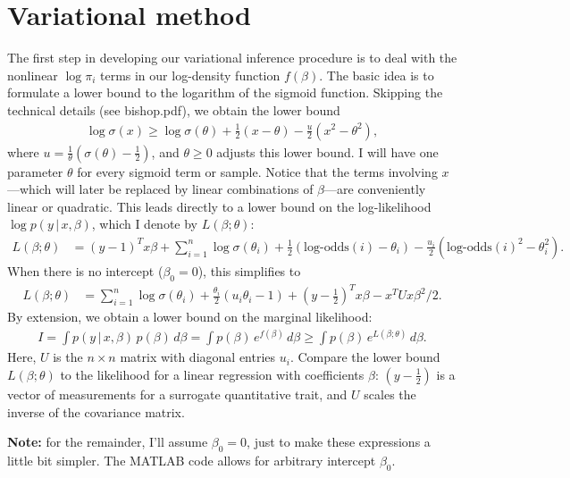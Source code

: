 \documentclass[final]{siamltex}
\newcommand{\smfrac}[2]{{\textstyle\frac{#1}{#2}}}
\newcommand{\half}{{\textstyle\frac{1}{2}}}
\newcommand{\smint}{\textstyle\int}
\newcommand{\logodds}{\mbox{log-odds}}
\begin{document}
\section*{Variational method}

The first step in developing our variational inference procedure is to
deal with the nonlinear $\log\pi_i$ terms in our log-density function
$f(\beta)$. The basic idea is to formulate a lower bound to the
logarithm of the sigmoid function. Skipping the technical details (see
bishop.pdf), we obtain the lower bound
\begin{align*}
\log\sigma(x) \geq 
\log\sigma(\theta) + \half(x-\theta) - \smfrac{u}{2}(x^2-\theta^2),
\end{align*}
where $u = \frac{1}{\theta}(\sigma(\theta) - \half)$, and $\theta \geq
0$ adjusts this lower bound. I will have one parameter $\theta$ for
every sigmoid term or sample. Notice that the terms involving
$x$---which will later be replaced by linear combinations of
$\beta$---are conveniently linear or quadratic. This leads directly to
a lower bound on the log-likelihood $\log p(y \,|\, x, \beta)$, which
I denote by $L(\beta; \theta)$:
\begin{align*}
L(\beta; \theta) &= 
(y-1)^Tx\beta + \sum_{i=1}^n \log\sigma(\theta_i) 
+ \half(\logodds(i) - \theta_i) 
- \smfrac{u_i}{2}(\logodds(i)^2 - \theta_i^2).
\end{align*}
When there is no intercept ($\beta_0 = 0$), this simplifies to
\begin{align*}
L(\beta; \theta) &= \sum_{i=1}^n \log\sigma(\theta_i) +
\smfrac{\theta_i}{2}(u_i\theta_i - 1)
+ (y-\half)^Tx\beta - x^TUx\beta^2/2.
\end{align*}
By extension, we obtain a lower bound on the marginal likelihood:
\begin{align*}
I 
= \smint p(y \,|\, x, \beta) \, p(\beta) \, d\beta 
= \smint p(\beta) \, e^{f(\beta)} \, d\beta 
\geq \smint p(\beta) \, e^{L(\beta; \theta)} \, d\beta.
\end{align*}
Here, $U$ is the $n \times n$ matrix with diagonal entries $u_i$.
Compare the lower bound $L(\beta; \theta)$ to the likelihood for a
linear regression with coefficients $\beta$: $(y - \half)$ is a vector
of measurements for a surrogate quantitative trait, and $U$ scales the
inverse of the covariance matrix.

{\bf Note:} for the remainder, I'll assume $\beta_0 = 0$, just to make
these expressions a little bit simpler. The MATLAB code allows for
arbitrary intercept $\beta_0$.
\end{document}
